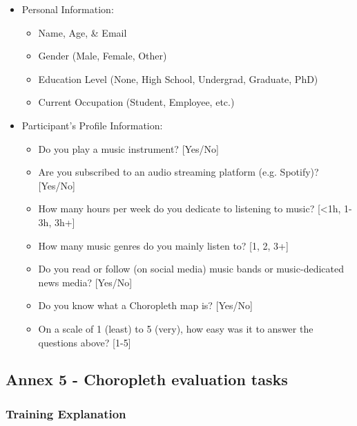 \documentclass[twocolumn, letterpaper,13pt]{scrartcl}
\begin{document}
    \begin{itemize}
        \item Personal Information:
        \begin{itemize}
            \item Name, Age, \& Email 
            \item Gender (Male, Female, Other)
            \item Education Level (None, High School, Undergrad, Graduate, PhD)
            \item Current Occupation (Student, Employee, etc.)
        \end{itemize}
        \item Participant's Profile Information:
        \begin{itemize}
            \item Do you play a music instrument? [Yes/No]
            \item Are you subscribed to an audio streaming platform (e.g. Spotify)? [Yes/No]
            \item How many hours per week do you dedicate to listening to music? [<1h, 1-3h, 3h+]
            \item How many music genres do you mainly listen to? [1, 2, 3+]
            \item Do you read or follow (on social media) music bands or music-dedicated news media? [Yes/No]
            \item Do you know what a Choropleth map is? [Yes/No]
            \item On a scale of 1 (least) to 5 (very), how easy was it to answer the questions above? [1-5]
        \end{itemize}
    \end{itemize}
    
    \subsection*{Annex 5 - Choropleth evaluation tasks}
    
    \subsubsection*{Training Explanation}
    
\end{document}
